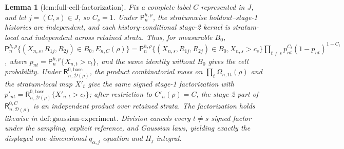 \documentclass{article}
\newtheorem{lemma}{Lemma}
\begin{document}
\begin{lemma}[lem:full-cell-factorization]\label{lem:full-cell-factorization}
Fix a complete label \(C\) represented in \(J\), and let \(j=(C,s)\in J\), so \(C_s=1\). Under \(\mathsf P_n^{h,\rho}\), the stratumwise holdout--stage-1 histories are independent, and each history-conditional stage-2 kernel is stratum-local and independent across retained strata. Thus, for measurable \(B_0\), \(\mathsf P_n^{h,\rho}\{(X_{n,s},R_{1j},R_{2j})\in B_0,E_{n,C}(\rho)\}=\mathsf P_n^{h,\rho}\{(X_{n,s},R_{1j},R_{2j})\in B_0,X_{n,s}>c_s\}\prod_{t\ne s}p_{nt}^{C_t}(1-p_{nt})^{1-C_t}\), where \(p_{nt}=\mathsf P_n^{h,\rho}\{X_{n,t}>c_t\}\), and the same identity without \(B_0\) gives the cell probability. Under \(\mathsf R_{n,\mathcal D(\rho)}^{0,\mathrm{base}}\), the product combinatorial mass on \(\prod_t\Omega_{n,1t}(\rho)\) and the stratum-local map \(X'_t\) give the same signed stage-1 factorization with \(p'_{nt}=\mathsf R_{n,\mathcal D(\rho)}^{0,\mathrm{base}}\{X'_{n,t}>c_t\}\); after restriction to \(C'_n(\rho)=C\), the stage-2 part of \(\mathsf R_{n,\mathcal D(\rho)}^{0,C}\) is an independent product over retained strata. The factorization holds likewise in \(\mathrm{def{:}gaussian\mbox{-}experiment}\). Division cancels every \(t\ne s\) signed factor under the sampling, explicit reference, and Gaussian laws, yielding exactly the displayed one-dimensional \(q_{\alpha,j}\) equation and \(\Pi_j\) integral.
\end{lemma}
\end{document}
